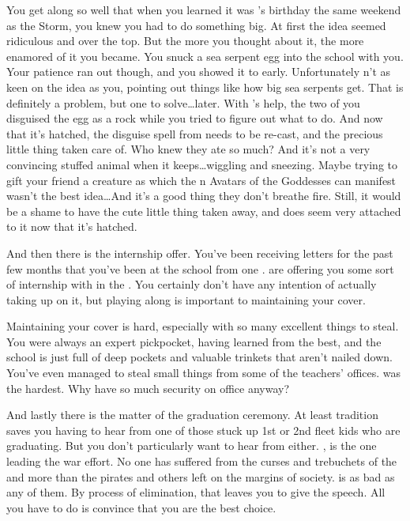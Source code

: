 \documentclass[char]{GL2020}
\begin{document}
You get along so well that when you learned it was \cDisney{}’s birthday the same weekend as the Storm, you knew you had to do something big. At first the idea seemed ridiculous and over the top. But the more you thought about it, the more enamored of it you became. You snuck a sea serpent egg into the school with you. Your patience ran out though, and you showed it to \cDisney{} early. Unfortunately \cDisney{\they} n’t as keen on the idea as you, pointing out things like how big sea serpents get. That is definitely a problem, but one to solve\ldots later. With \cAdopted{}’s help, the two of you disguised the egg as a rock while you tried to figure out what to do. And now that it’s hatched, the disguise spell from \cAdopted{} needs to be re-cast, and the precious little thing taken care of. Who knew they ate so much? And it’s not a very convincing stuffed animal when it keeps\ldots wiggling and sneezing. Maybe trying to gift your friend a creature as which the \pEarth{}n Avatars of the Goddesses can manifest wasn’t the best idea\ldots And it’s a good thing they don’t breathe fire. Still, it would be a shame to have the cute little thing taken away, and \cDisney{} does seem very attached to it now that it’s hatched.

And then there is the internship offer. You’ve been receiving letters for the past few months that you’ve been at the school from one \cEvil{}. \cEvil{\They} are offering you some sort of internship with \cEvil{\them}in the \pFarm{}. You certainly don’t have any intention of actually taking \cEvil{\them} up on it, but playing along is important to maintaining your cover.

Maintaining your cover is hard, especially with so many excellent things to steal. You were always an expert pickpocket, having learned from the best, and the school is just full of deep pockets and valuable trinkets that aren’t nailed down. You’ve even managed to steal small things from some of the teachers’ offices. \cChupInventor{} was the hardest. Why \cChupInventor{\does} \cChupInventor{\they} have so much security on \cChupInventor{\their} office anyway?

And lastly there is the matter of the graduation ceremony. At least tradition saves you having to hear from one of those stuck up 1st or 2nd fleet kids who are graduating. But you don’t particularly want to hear from \cWarlordDaughter{} either. \cWarlordDaughter{\Their} \cLoud{\parent}, \cLoud{\full} is the one leading the war effort. No one has suffered from the curses and trebuchets of the \pFarm{} and \pTech{} more than the pirates and others left on the margins of \pShip{} society. \cWarlordDaughter{} is as bad as any of them. By process of elimination, that leaves you to give the speech. All you have to do is convince \cMusic{} that you are the best choice.
\end{document}
